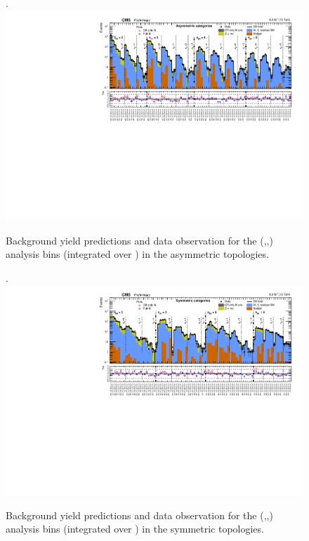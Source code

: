 \clearpage
\begin{landscape}
  \begin{center}
    \begin{figure}[h!]
      \caption{Background yield predictions and data observation for the (\njet,\nb,\scalht) analysis bins (integrated over \MHT) in the asymmetric topologies. \label{fig:summaryPlot_Asymmetric}}.
      \includegraphics[width=0.9\linewidth]{figures/postFitResults/summaryPlots/summaryPlot_Asymmetric_prefit_overlay_fit_b_CRFit}
    \end{figure}
  \end{center}
\end{landscape}

\clearpage
\begin{landscape}
  \begin{center}
    \begin{figure}[h!]
      \caption{Background yield predictions and data observation for the (\njet,\nb,\scalht) analysis bins (integrated over \MHT) in the symmetric topologies. \label{fig:summaryPlot_Symmetric}}.
      \includegraphics[width=0.9\linewidth]{figures/postFitResults/summaryPlots/summaryPlot_Symmetric_prefit_overlay_fit_b_CRFit}
    \end{figure}
  \end{center}
\end{landscape}


